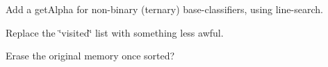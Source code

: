 
\begin{DoxyRefList}
\item[\label{todo__todo000002}%
\hypertarget{todo__todo000002}{}%
Class \hyperlink{classMultiBoost_1_1BaseLearner}{Multi\-Boost\-:\-:Base\-Learner} ]Add a get\-Alpha for non-\/binary (ternary) base-\/classifiers, using line-\/search.  
\item[\label{todo__todo000003}%
\hypertarget{todo__todo000003}{}%
Member \hyperlink{classMultiBoost_1_1HaarFeature_a27de701185caaff11713083941f9880e}{Multi\-Boost\-:\-:Haar\-Feature\-:\-:move\-To\-Next\-Config} ()]Replace the \char`\"{}visited\char`\"{} list with something less awful.  
\item[\label{todo__todo000001}%
\hypertarget{todo__todo000001}{}%
Member \hyperlink{classMultiBoost_1_1SortedData_a4026ff8765982ac0c0edff12a929917f}{Multi\-Boost\-:\-:Sorted\-Data\-:\-:load} (const string \&file\-Name, e\-Input\-Type input\-Type=I\-T\-\_\-\-T\-R\-A\-I\-N, int verbose\-Level=1)]Erase the original memory once sorted? 
\end{DoxyRefList}